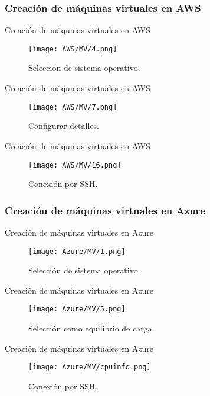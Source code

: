\documentclass[aspectratio=169]{beamer}
\begin{document}
\subsubsection{Creación de máquinas virtuales en AWS}
\begin{frame}{Creación de máquinas virtuales en AWS}
	\begin{figure}[h]
		\centering
		\texttt{[image: AWS/MV/4.png]}
		\caption{Selección de sistema operativo.}
		\label{Sistema operativo}
	\end{figure}
\end{frame}

\begin{frame}{Creación de máquinas virtuales en AWS}
\begin{figure}[h]
	\centering
	\texttt{[image: AWS/MV/7.png]}
	\caption{Configurar detalles.}
	\label{Configurar detalles}
\end{figure}
\end{frame}

\begin{frame}{Creación de máquinas virtuales en AWS}
\begin{figure}[h]
	\centering
	\texttt{[image: AWS/MV/16.png]}
	\caption{Conexión por SSH.}
	\label{SSH}
\end{figure}
\end{frame}

\subsubsection{Creación de máquinas virtuales en Azure}
\begin{frame}{Creación de máquinas virtuales en Azure}
	\begin{figure}[h]
		\centering
		\texttt{[image: Azure/MV/1.png]}
		\caption{Selección de sistema operativo.}
		\label{Sistema operativo2}
	\end{figure}
\end{frame}

\begin{frame}{Creación de máquinas virtuales en Azure}
\begin{figure}[h]
	\centering
	\texttt{[image: Azure/MV/5.png]}
	\caption{Selección como equilibrio de carga.}
	\label{Equilibrio de carga}
\end{figure}
\end{frame}

\begin{frame}{Creación de máquinas virtuales en Azure}
\begin{figure}[h]
	\centering
	\texttt{[image: Azure/MV/cpuinfo.png]}
	\caption{Conexión por SSH.}
	\label{SSH2}
\end{figure}
\end{frame}
\end{document}
